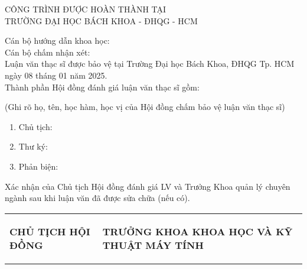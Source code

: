 \begin{boxA}
\begin{titlepage}
\begin{center}
    CÔNG TRÌNH ĐƯỢC HOÀN THÀNH TẠI\\
    TRƯỜNG ĐẠI HỌC BÁCH KHOA - ĐHQG - HCM
\end{center}

Cán bộ hướng dẫn khoa học:
\\

Cán bộ chấm nhận xét: 
\\

Luận văn thạc sĩ được bảo vệ tại Trường Đại học Bách Khoa, ĐHQG Tp. HCM ngày 08 tháng 01 năm 2025.
\\

Thành phần Hội đồng đánh giá luận văn thạc sĩ gồm:

(Ghi rõ họ, tên, học hàm, học vị của Hội đồng chấm bảo vệ luận văn thạc sĩ)
\begin{enumerate}
    \item Chủ tịch: 
    \item Thư ký: 
    \item Phản biện: 
\end{enumerate}

Xác nhận của Chủ tịch Hội đồng đánh giá LV và Trưởng Khoa quản lý chuyên ngành sau khi luận văn đã được sửa chữa (nếu có).

\vspace{1em}
\begin{tabular}
{p{} p{}}
     \begin{center}
         \textbf{CHỦ TỊCH HỘI ĐỒNG}
     \end{center}& \begin{center}
         \textbf{TRƯỞNG KHOA KHOA HỌC VÀ KỸ THUẬT MÁY TÍNH}
     \end{center}   \\
\end{tabular}
\end{titlepage}
\end{boxA}